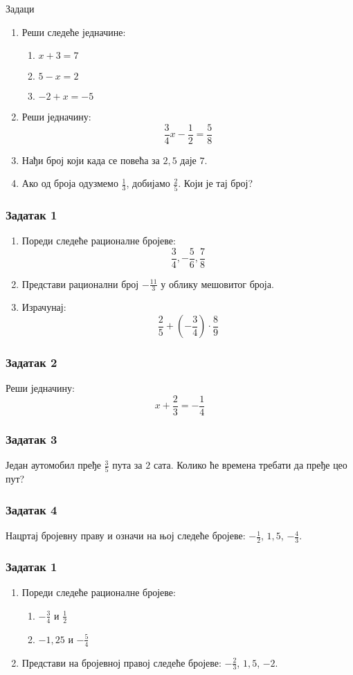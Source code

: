 \documentclass[11pt]{beamer}
\begin{document}
\begin{frame}{Задаци}
\begin{enumerate}
    \item Реши следеће једначине:
        \begin{enumerate}
            \item $x + 3 = 7$
            \item $5 - x = 2$
            \item $-2 + x = -5$
        \end{enumerate}
    \item Реши једначину:
        \[ \frac{3}{4}x - \frac{1}{2} = \frac{5}{8} \]
    \item Нађи број који када се повећа за $2,\!5$ даје $7$.
    \item Ако од броја одузмемо $\frac{1}{3}$,
        добијамо $\frac{2}{5}$. Који је тај број?
\end{enumerate}
\end{frame}

\begin{frame}
\frametitle{Задатак 1}
\begin{enumerate}
    \item Пореди следеће рационалне бројеве: 
        \[ \frac{3}{4}, -\frac{5}{6}, \frac{7}{8} \]
    \item Представи рационални број $-\frac{11}{3}$ у облику мешовитог броја.
    \item Израчунај:
        \[ \frac{2}{5} + \left(-\frac{3}{4}\right) \cdot \frac{8}{9} \]
\end{enumerate}
\end{frame}

\begin{frame}
\frametitle{Задатак 2}
Реши једначину:
\[ x + \frac{2}{3} = -\frac{1}{4} \]
\end{frame}

\begin{frame}
\frametitle{Задатак 3}
Један аутомобил пређе $\frac{3}{5}$ пута за $2$ сата.
Колико ће времена требати да пређе цео пут?
\end{frame}

\begin{frame}
\frametitle{Задатак 4}
Нацртај бројевну праву и означи на њој следеће бројеве:
$-\frac{1}{2}$, $1,\!5$, $-\frac{4}{3}$.
\end{frame}

\begin{frame}
\frametitle{Задатак 1}
\begin{enumerate}
\item Пореди следеће рационалне бројеве: 
    \begin{enumerate}
    \item $-\frac{3}{4}$ и $\frac{1}{2}$ 
    \item $-1,\!25$ и $-\frac{5}{4}$
    \end{enumerate}
\item Представи на бројевној правој следеће бројеве: $-\frac{2}{3}$, $1,\!5$, $-2$.
\end{enumerate}
\end{frame}
\end{document}
